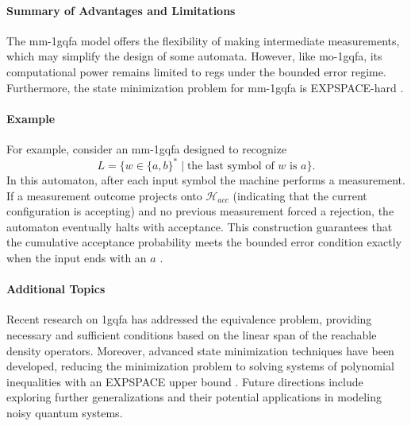 \paragraph{Summary of Advantages and Limitations} 
The \gls{mm-1gqfa} model offers the flexibility of making intermediate measurements, which may simplify the design of some automata. However, like \gls{mo-1gqfa}, its computational power remains limited to \glspl{reg} under the bounded error regime. Furthermore, the state minimization problem for \gls{mm-1gqfa} is EXPSPACE-hard \cite{mateus2012complexity}.

\paragraph{Example}  
For example, consider an \gls{mm-1gqfa} designed to recognize 
\[
L=\{w\in\{a,b\}^* \mid \text{the last symbol of }w\text{ is }a\}.
\]
In this automaton, after each input symbol the machine performs a measurement. If a measurement outcome projects onto $\mathcal{H}_{acc}$ (indicating that the current configuration is accepting) and no previous measurement forced a rejection, the automaton eventually halts with acceptance. This construction guarantees that the cumulative acceptance probability meets the bounded error condition exactly when the input ends with an $a$ \cite{li2012characterizations}.

\paragraph{Additional Topics}  
Recent research on \gls{1gqfa} has addressed the equivalence problem, providing necessary and sufficient conditions based on the linear span of the reachable density operators. Moreover, advanced state minimization techniques have been developed, reducing the minimization problem to solving systems of polynomial inequalities with an EXPSPACE upper bound \cite{mercer2008lower}. Future directions include exploring further generalizations and their potential applications in modeling noisy quantum systems.


